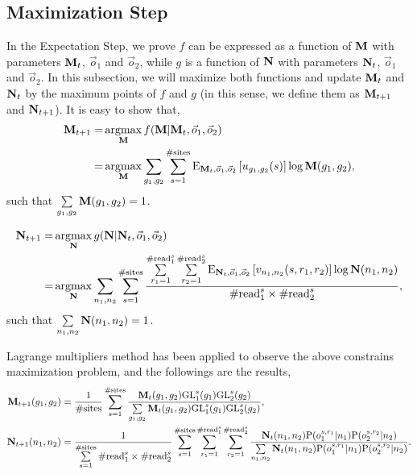 \documentclass{article}
\DeclareMathOperator*{\argmax}{argmax}
\begin{document}
\subsection{Maximization Step}
In the Expectation Step, we prove $f$ can be expressed as a function of $\bf M$ with parameters ${\bf M}_t$, $\vec{o}_1$ and $\vec{o}_2$, while $g$ is a function of $\bf N$ with parameters ${\bf N}_t$, $\vec{o}_1$ and $\vec{o}_2$. In this subsection, we will maximize both functions and update ${\bf M}_t$ and ${\bf N}_t$ by the maximum points of $f$ and $g$ (in this sense, we define them as ${\bf M}_{t+1}$ and ${\bf N}_{t+1}$). It is easy to show that,
\begin{align*}
{\bf M}_{t+1}=&\argmax_{{\bf M}}f({\bf M}|{\bf M}_{t},\vec{o}_1,\vec{o}_2)\\
=&\argmax_{{\bf M}}\sum_{g_1,g_2}\sum_{s=1}^{\#\mathrm{sites}}\mathrm{E}_{{\bf M}_{t},\vec{o}_1,\vec{o}_2}\left[u_{g_1,g_2}(s)\right]\log{\bf M}(g_1,g_2),
\end{align*}
such that $\sum\limits_{g_1,g_2}{\bf M}(g_1,g_2)=1$.

\begin{align*}
{\bf N}_{t+1}=&\argmax_{{\bf N}}g({\bf N}|{\bf N}_{t},\vec{o}_1,\vec{o}_2)\\
=&\argmax_{{\bf N}}\sum_{n_1,n_2}\sum_{s=1}^{\#\mathrm{sites}}\frac{\sum\limits_{r_1=1}^{\#\mathrm{read}_1^s}\sum\limits_{r_2=1}^{\#\mathrm{read}_2^s}\mathrm{E}_{{\bf N}_t,\vec{o}_1,\vec{o}_2}\left[v_{n_1,n_2}(s,r_1,r_2)\right]\log{\bf N}(n_1,n_2)}{\#\mathrm{read}_1^s\times\#\mathrm{read}_2^s},
\end{align*}
such that $\sum\limits_{n_1,n_2}{\bf N}(n_1,n_2)=1$.


Lagrange multipliers method has been applied to observe the above constrains maximization problem, and the followings are the results,
\begin{align}
{\bf M}_{t+1}(g_1,g_2)&=\frac{1}{\#\mathrm{sites}}\sum_{s=1}^{\#\mathrm{sites}}\frac{{\bf M}_{t}(g_1,g_2)\mathrm{GL}_1^s(g_1)\mathrm{GL}_2^s(g_2)}{\sum\limits_{g_1,g_2}{\bf M}_{t}(g_1,g_2)\mathrm{GL}_1^s(g_1)\mathrm{GL}_2^s(g_2)}, \label{eq:Miteration}\\
{\bf N}_{t+1}(n_1,n_2)&=\frac{1}{\sum\limits_{s=1}^{\#\mathrm{sites}}\#\mathrm{read}_1^s\times\#\mathrm{read}_2^s}\sum\limits_{s=1}^{\#\mathrm{sites}}\sum\limits_{r_1=1}^{\#\mathrm{read}_1^s}\sum\limits_{r_2=1}^{\#\mathrm{read}_2^s}\frac{{\bf N}_t(n_1,n_2)\mathrm{P}(o_1^{s,r_1}|n_1)\mathrm{P}(o_2^{s,r_2}|n_2)}{\sum\limits_{n_1,n_2}{\bf N}_t(n_1,n_2)\mathrm{P}(o_1^{s,r_1}|n_1)\mathrm{P}(o_2^{s,r_2}|n_2)}. \label{eq:Niteration}
\end{align}
\end{document}
